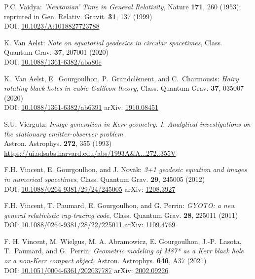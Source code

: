 \begin{thebibliography}{123}
P.C. Vaidya:
{\em 'Newtonian' Time in General Relativity},
Nature {\bf 171}, 260 (1953);
reprinted in Gen. Relativ. Gravit. {\bf 31}, 137 (1999)\\
DOI: \href{https://doi.org/10.1023/A:1018827723788}{10.1023/A:1018827723788}

K. Van Aelst: {\em Note on equatorial geodesics in circular spacetimes},
Class. Quantum Grav. {\bf 37}, 207001 (2020)\\
DOI: \href{https://doi.org/10.1088/1361-6382/aba80c}{10.1088/1361-6382/aba80c}

K.~Van Aelst, E.~Gourgoulhon, P.~Grandclément, and C.~Charmousis:
{\em Hairy rotating black holes in cubic Galileon theory},
Class. Quantum Grav. {\bf 37}, 035007 (2020)\\
DOI: \href{https://doi.org/10.1088/1361-6382/ab6391}{10.1088/1361-6382/ab6391}\hfill
arXiv: \href{https://arxiv.org/abs/1910.08451}{1910.08451}

S.U. Viergutz:
{\em Image generation in Kerr geometry. I. Analytical investigations on the stationary emitter-observer problem}\\
Astron. Astrophys. {\bf 272}, 355 (1993)\\
\url{https://ui.adsabs.harvard.edu/abs/1993A&A...272..355V}

F.H. Vincent, E. Gourgoulhon, and J. Novak:
{\em 3+1 geodesic equation and images in numerical spacetimes},
Class. Quantum Grav. {\bf 29}, 245005 (2012)\\
DOI: \href{https://doi.org/10.1088/0264-9381/29/24/245005}{10.1088/0264-9381/29/24/245005}\hfill
arXiv: \href{https://arxiv.org/abs/1208.3927}{1208.3927}

F.H. Vincent, T. Paumard, E. Gourgoulhon, and G. Perrin:
{\em GYOTO: a new general relativistic ray-tracing code},
Class. Quantum Grav. {\bf 28}, 225011 (2011)\\
DOI: \href{https://doi.org/10.1088/0264-9381/28/22/225011}{10.1088/0264-9381/28/22/225011}
\hfill
arXiv: \href{https://arxiv.org/abs/1109.4769}{1109.4769}

F. H. Vincent, M. Wielgus, M. A. Abramowicz, E. Gourgoulhon, J.-P.~Lasota, T.~Paumard,
and G.~Perrin:
{\em Geometric modeling of M87* as a Kerr black hole or a non-Kerr compact object},
Astron. Astrophys. {\bf 646}, A37 (2021)\\
DOI: \href{https://doi.org/10.1051/0004-6361/202037787}{10.1051/0004-6361/202037787}\hfill
arXiv: \href{https://arxiv.org/abs/2002.09226}{2002.09226}


\end{thebibliography}
